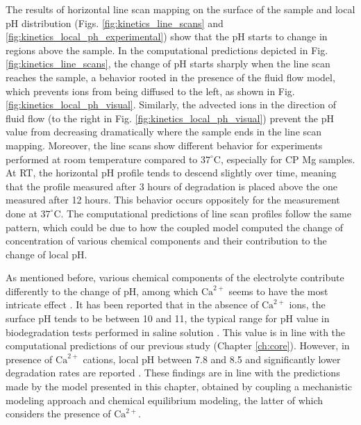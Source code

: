 The results of horizontal line scan mapping on the surface of the sample and local pH distribution (Figs. \ref{fig:kinetics_line_scans} and \ref{fig:kinetics_local_ph_experimental}) show that the pH starts to change in regions above the sample. In the computational predictions depicted in Fig. \ref{fig:kinetics_line_scans}, the change of pH starts sharply when the line scan reaches the sample, a behavior rooted in the presence of the fluid flow model, which prevents ions from being diffused to the left, as shown in Fig. \ref{fig:kinetics_local_ph_visual}. Similarly, the advected ions in the direction of fluid flow (to the right in Fig. \ref{fig:kinetics_local_ph_visual}) prevent the pH value from decreasing dramatically where the sample ends in the line scan mapping. Moreover, the line scans show different behavior for experiments performed at room temperature compared to $37^{\circ}\text{C}$, especially for \gls{CP} Mg samples. At \gls{RT}, the horizontal pH profile tends to descend slightly over time, meaning that the profile measured after 3 hours of degradation is placed above the one measured after 12 hours. This behavior occurs oppositely for the measurement done at $37^{\circ}\text{C}$. The computational predictions of line scan profiles follow the same pattern, which could be due to how the coupled model computed the change of concentration of various chemical components and their contribution to the change of local pH.

As mentioned before, various chemical components of the electrolyte contribute differently to the change of pH, among which $\mathrm{Ca}^{2+}$ seems to have the most intricate effect \cite{Willumeit-Roemer2019}. It has been reported that in the absence of $\mathrm{Ca}^{2+}$ ions, the surface pH tends to be between 10 and 11, the typical range for pH value in biodegradation tests performed in saline solution \cite{Gonzalez2021}. This value is in line with the computational predictions of our previous study \cite{Barzegari2021} (Chapter \ref{ch:core}). However, in presence of $\mathrm{Ca}^{2+}$ cations, local pH between 7.8 and 8.5 and significantly lower degradation rates are reported \cite{Mei2019,Gnedenkov2019,Tefashe2015,Lamaka2009}. These findings are in line with the predictions made by the model presented in this chapter, obtained by coupling a mechanistic modeling approach and chemical equilibrium modeling, the latter of which considers the presence of $\mathrm{Ca}^{2+}$.

